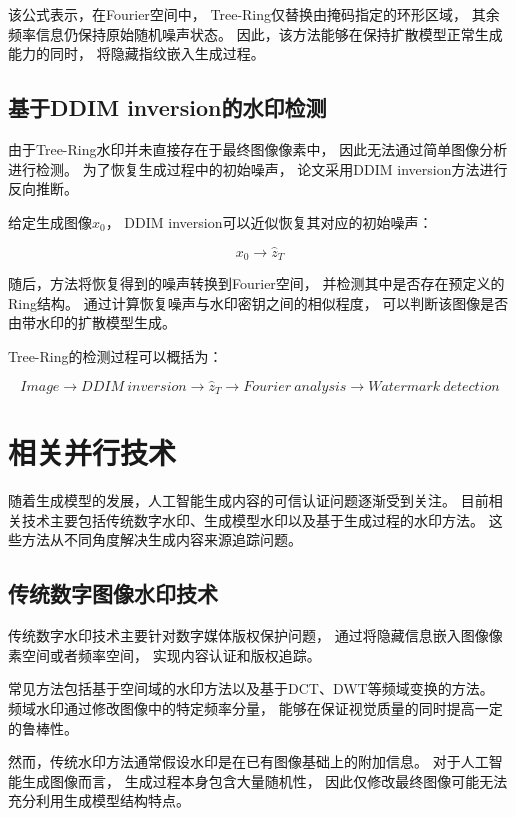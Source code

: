\documentclass[12pt,a4paper]{article}
\begin{document}
该公式表示，在Fourier空间中，
Tree-Ring仅替换由掩码指定的环形区域，
其余频率信息仍保持原始随机噪声状态。
因此，该方法能够在保持扩散模型正常生成能力的同时，
将隐藏指纹嵌入生成过程。

\subsection{基于DDIM inversion的水印检测}

由于Tree-Ring水印并未直接存在于最终图像像素中，
因此无法通过简单图像分析进行检测。
为了恢复生成过程中的初始噪声，
论文采用DDIM inversion方法进行反向推断。


给定生成图像$x_0$，
DDIM inversion可以近似恢复其对应的初始噪声：

\begin{equation}
x_0 \rightarrow \hat{z}_T
\end{equation}


随后，方法将恢复得到的噪声转换到Fourier空间，
并检测其中是否存在预定义的Ring结构。
通过计算恢复噪声与水印密钥之间的相似程度，
可以判断该图像是否由带水印的扩散模型生成。


Tree-Ring的检测过程可以概括为：

\begin{equation}
Image
\rightarrow
DDIM\ inversion
\rightarrow
\hat{z}_T
\rightarrow
Fourier\ analysis
\rightarrow
Watermark\ detection
\end{equation}



\section{相关并行技术}

随着生成模型的发展，人工智能生成内容的可信认证问题逐渐受到关注。
目前相关技术主要包括传统数字水印、生成模型水印以及基于生成过程的水印方法。
这些方法从不同角度解决生成内容来源追踪问题。


\subsection{传统数字图像水印技术}

传统数字水印技术主要针对数字媒体版权保护问题，
通过将隐藏信息嵌入图像像素空间或者频率空间，
实现内容认证和版权追踪。

常见方法包括基于空间域的水印方法以及基于DCT、DWT等频域变换的方法。
频域水印通过修改图像中的特定频率分量，
能够在保证视觉质量的同时提高一定的鲁棒性。

然而，传统水印方法通常假设水印是在已有图像基础上的附加信息。
对于人工智能生成图像而言，
生成过程本身包含大量随机性，
因此仅修改最终图像可能无法充分利用生成模型结构特点。
\end{document}

